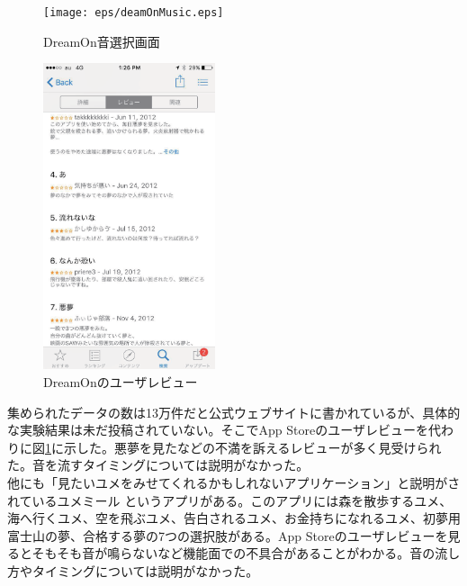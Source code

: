 \begin{figure}[htbp]
 \begin{minipage}{0.45\hsize}
  \begin{center}
   \texttt{[image: eps/deamOnMusic.eps]}
  \end{center}
  \caption{DreamOn音選択画面}
  \label{DreamOnMusicSlection}
 \end{minipage}
 \begin{minipage}{0.45\hsize}
  \begin{center}
   \includegraphics[height=90mm]{eps/dreamOn.eps}
  \end{center}
  \caption{DreamOnのユーザレビュー}
  \label{DreamOnImage}
 \end{minipage}
\end{figure}
集められたデータの数は13万件だと公式ウェブサイトに書かれているが、具体的な実験結果は未だ投稿されていない。そこでApp Storeのユーザレビューを代わりに図\ref{DreamOnImage}に示した。悪夢を見たなどの不満を訴えるレビューが多く見受けられた。音を流すタイミングについては説明がなかった。\\
他にも「見たいユメをみせてくれるかもしれないアプリケーション」と説明がされているユメミール \cite{yumemiru}というアプリがある。このアプリには森を散歩するユメ、海へ行くユメ、空を飛ぶユメ、告白されるユメ、お金持ちになれるユメ、初夢用富士山の夢、合格する夢の7つの選択肢がある。App Storeのユーザレビューを見るとそもそも音が鳴らないなど機能面での不具合があることがわかる。音の流し方やタイミングについては説明がなかった。
